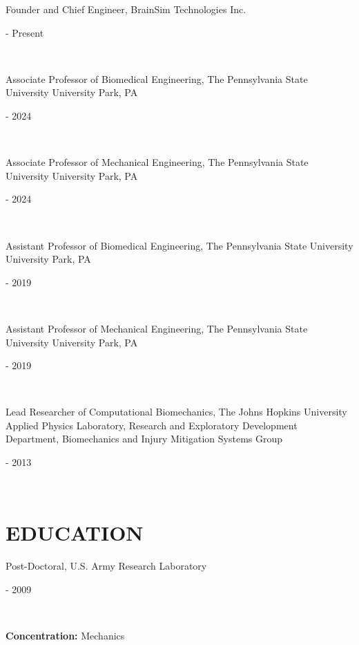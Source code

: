 \documentclass[a4paper,10pt]{article}
\begin{document}
                \noindent \parbox[t]{0.8\linewidth}{\raggedright Founder and Chief Engineer, BrainSim Technologies Inc.} \hfill \parbox[t]{0.2\linewidth}{ - Present} \\
                
                \noindent \parbox[t]{0.8\linewidth}{\raggedright Associate Professor of Biomedical Engineering, The Pennsylvania State University
University Park, PA} \hfill \parbox[t]{0.2\linewidth}{ - 2024} \\
                
                \noindent \parbox[t]{0.8\linewidth}{\raggedright Associate Professor of Mechanical Engineering, The Pennsylvania State University
University Park, PA} \hfill \parbox[t]{0.2\linewidth}{ - 2024} \\
                
                \noindent \parbox[t]{0.8\linewidth}{\raggedright Assistant Professor of Biomedical Engineering, The Pennsylvania State University
University Park, PA} \hfill \parbox[t]{0.2\linewidth}{ - 2019} \\
                
                \noindent \parbox[t]{0.8\linewidth}{\raggedright Assistant Professor of Mechanical Engineering, The Pennsylvania State University
University Park, PA} \hfill \parbox[t]{0.2\linewidth}{ - 2019} \\
                
                \noindent \parbox[t]{0.8\linewidth}{\raggedright Lead Researcher of Computational Biomechanics, The Johns Hopkins University Applied Physics Laboratory, Research and Exploratory Development Department, Biomechanics and Injury Mitigation Systems Group} \hfill \parbox[t]{0.2\linewidth}{ - 2013} \\
                

    \section*{EDUCATION}
    
            \noindent \parbox[t]{0.8\linewidth}{\raggedright Post-Doctoral, U.S. Army Research Laboratory} \hfill \parbox[t]{0.2\linewidth}{ - 2009} \\
            \noindent \parbox[t]{0.8\linewidth}{\raggedright \textbf{Concentration:} Mechanics} \\
            
\end{document}
